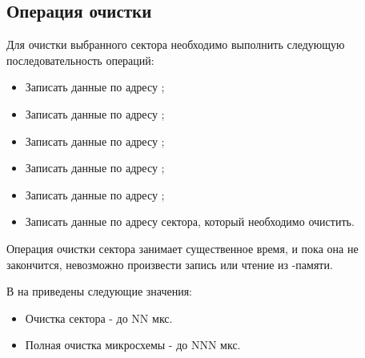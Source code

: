 \subsection{Операция очистки}
\par{Для очистки выбранного сектора необходимо выполнить следующую последовательность операций:
\begin{itemize}[noitemsep, label={}]
  \item Записать данные  по адресу ;
  \item Записать данные  по адресу ;
  \item Записать данные  по адресу ;
  \item Записать данные  по адресу ;
  \item Записать данные  по адресу ;
  \item Записать данные  по адресу сектора, который необходимо очистить.
\end{itemize}}
\par{Операция очистки сектора занимает существенное время, и пока она не закончится, невозможно произвести запись или чтение из -памяти.}
\par{В  на  приведены следующие значения:
\begin{itemize}[noitemsep, label={}]
  \item Очистка сектора - до NN мкс.
  \item Полная очистка микросхемы - до NNN мкс.
\end{itemize}}


